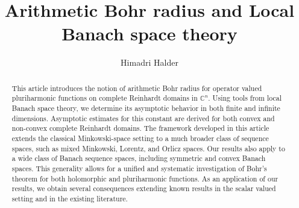 \documentclass[a4paper,11pt, reqno]{amsart}
\theoremstyle{definition}
\newcounter{minutes}\setcounter{minutes}{\time}
\newcounter{hours}\setcounter{hours}{\time}
\newcounter {own}
\begin{document}
	
	\title[]{Arithmetic Bohr radius and Local Banach space theory
	}
	
	
	
	
	\author{Himadri Halder}
	\address{Himadri Halder,
		Department of Mathematics,
		Indian Institute of Science, Bangalore-560012, India}
	
	
	
	
	
	
	
	
	\begin{abstract}
		This article introduces the notion of arithmetic Bohr radius for operator valued pluriharmonic functions on complete Reinhardt domains in $\mathbb{C}^n$. Using tools from local Banach space theory, we determine its asymptotic behavior in both finite and infinite dimensions. Asymptotic estimates for this constant are derived for both convex and non-convex complete Reinhardt domains. The framework developed in this article extends the classical Minkowski-space setting to a much broader class of sequence spaces, such as mixed Minkowski, Lorentz, and Orlicz spaces. Our results also apply to a wide class of Banach sequence spaces, including symmetric and convex Banach spaces. This generality allows for a unified and systematic investigation of Bohr’s theorem for both holomorphic and pluriharmonic functions. As an application of our results, we obtain several consequences extending known results in the scalar valued setting and in the existing literature.
	\end{abstract}
	
	
	
	\maketitle
	\pagestyle{myheadings}
	
\end{document}
